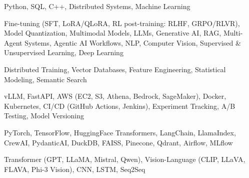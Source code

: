 \documentclass[letter,10pt]{article}
\begin{document}
 Python, SQL, C++, Distributed Systems, Machine Learning\par\vspace{2pt}

 Fine-tuning (SFT, LoRA/QLoRA, RL post-training: RLHF, GRPO/RLVR), Model Quantization, Multimodal Models, LLMs, Generative AI, RAG, Multi-Agent Systems, Agentic AI Workflows, NLP, Computer Vision, Supervised \& Unsupervised Learning, Deep Learning\par\vspace{2pt}

 Distributed Training, Vector Databases, Feature Engineering, Statistical Modeling, Semantic Search\par\vspace{2pt}

 vLLM, FastAPI, AWS (EC2, S3, Athena, Bedrock, SageMaker), Docker, Kubernetes, CI/CD (GitHub Actions, Jenkins), Experiment Tracking, A/B Testing, Model Versioning\par\vspace{2pt}

 PyTorch, TensorFlow, HuggingFace Transformers, LangChain, LlamaIndex, CrewAI, PydanticAI, DuckDB, FAISS, Pinecone, Qdrant, Airflow, MLflow\par\vspace{2pt}

 Transformer (GPT, LLaMA, Mistral, Qwen), Vision-Language (CLIP, LLaVA, FLAVA, Phi-3 Vision), CNN, LSTM, Seq2Seq
\end{document}
